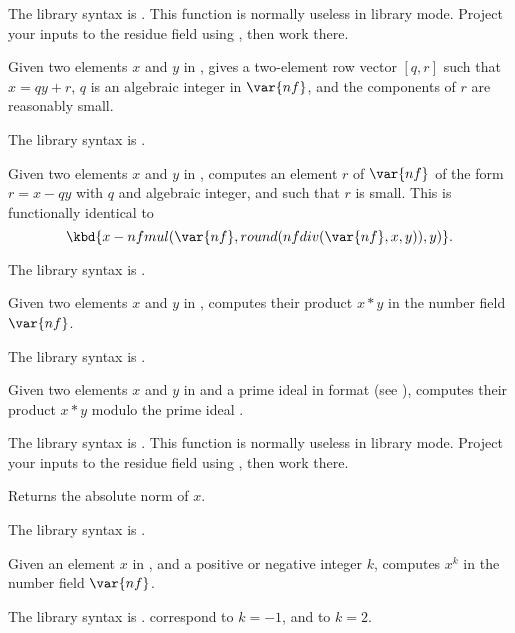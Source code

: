 The library syntax is .
This function is normally useless in library mode. Project your
inputs to the residue field using , then work there.

\label{se:nfeltdivrem}
Given two elements $x$ and $y$ in
, gives a two-element row vector $[q,r]$ such that $x=qy+r$, $q$ is
an algebraic integer in $\var{nf}$, and the components of $r$ are
reasonably small.

The library syntax is .

\label{se:nfeltmod}
Given two elements $x$ and $y$ in
, computes an element $r$ of $\var{nf}$ of the form $r=x-qy$ with
$q$ and algebraic integer, and such that $r$ is small. This is functionally
identical to
$$\kbd{x - nfmul(\var{nf},round(nfdiv(\var{nf},x,y)),y)}.$$

The library syntax is .

\label{se:nfeltmul}
Given two elements $x$ and $y$ in
, computes their product $x*y$ in the number field $\var{nf}$.

The library syntax is .

\label{se:nfeltmulmodpr}
Given two elements $x$ and
$y$ in  and  a prime ideal in  format (see
), computes their product $x*y$ modulo the prime ideal
.

The library syntax is .
This function is normally useless in library mode. Project your
inputs to the residue field using , then work there.

\label{se:nfeltnorm}
Returns the absolute norm of $x$.

The library syntax is .

\label{se:nfeltpow}
Given an element $x$ in , and a positive or negative integer $k$,
computes $x^k$ in the number field $\var{nf}$.

The library syntax is .
 correspond to $k = -1$, and
 to $k = 2$.

